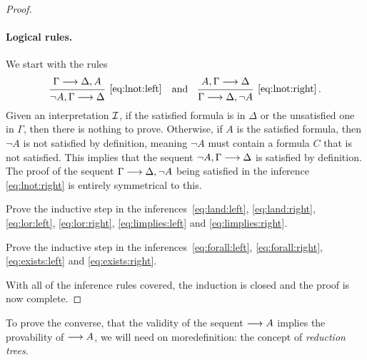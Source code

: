\documentclass[11pt,a4paper]{article}
\begin{document}
\begin{proof}
    \paragraph{Logical rules.}
    We start with the rules
    \begin{equation*}
        \begin{prooftree}
            \hypo{\Gamma\seq\Delta,A}
            \infer1[\eqref{eq:lnot:left}]{\lnot A, \Gamma\seq\Delta}
        \end{prooftree}
        \quad\text{and}\quad
        \begin{prooftree}
            \hypo{A, \Gamma\seq\Delta}
            \infer1[\eqref{eq:lnot:right}]{\Gamma\seq\Delta, \lnot A}
        \end{prooftree}\,.
    \end{equation*}
    Given an interpretation \(\mathcal{I}\),
    if the satisfied formula is in \(\Delta\) or the unsatisfied
    one in \(\Gamma\), then there is nothing to prove.
    Otherwise, if \(A\) is the satisfied formula,
    then \(\lnot A\) is not satisfied by definition,
    meaning \(\lnot A\) must contain a formula \(C\) that is not satisfied.
    This implies that the sequent \(\lnot A,\Gamma\longrightarrow\Delta\) is satisfied by definition.
    The proof of the sequent \(\Gamma\longrightarrow\Delta,\lnot A\) being satisfied
    in the inference \eqref{eq:lnot:right} is entirely symmetrical to this.

    \begin{exercise}[Exercise 8.2.1]\label{exe:8.2.1}
        Prove the inductive step in the inferences~\eqref{eq:land:left},
        \eqref{eq:land:right}, \eqref{eq:lor:left}, \eqref{eq:lor:right},
        \eqref{eq:limplies:left} and \eqref{eq:limplies:right}.
    \end{exercise}

    \begin{exercise}[Exercise 8.2.2]\label{exe:8.2.2}
        Prove the inductive step in the inferences~\eqref{eq:forall:left},
        \eqref{eq:forall:right}, \eqref{eq:exists:left} and \eqref{eq:exists:right}.
    \end{exercise}

    With all of the inference rules covered,
    the induction is closed and the proof is now complete.
\end{proof}

To prove the converse, that the validity of the sequent \(\longrightarrow A\)
implies the provability of \(\longrightarrow A\), we will need on moredefinition:
the concept of \emph{reduction trees}.
\end{document}

